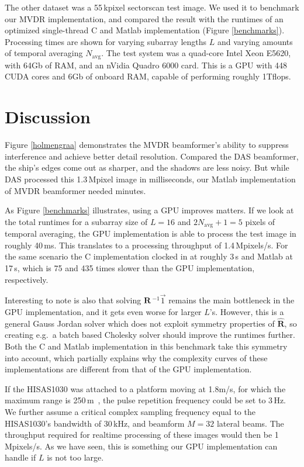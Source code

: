 \documentclass[10pt,a4paper]{article}
\newcommand\Fig[1]{Figure \ref{#1}}
\newcommand\mat[1]{\boldsymbol{#1}}
\newcommand\1{\vec 1}
\newcommand*\eR{\mat{\hat R}}
\newcommand*\eRi{\hat{\mat R}\,\!^{-1}}
\begin{document}
The other dataset was a 55\,kpixel sectorscan test image. We used it to benchmark our \gls{MVDR} implementation, and compared the result with the runtimes of an optimized single-thread C and Matlab implementation (\Fig{benchmarks}). Processing times are shown for varying subarray lengths $L$ and varying amounts of temporal averaging $N_\text{avg}$. The test system was a quad-core Intel Xeon E5620, with 64Gb of \gls{RAM}, and an nVidia Quadro 6000 card. This is a \gls{GPU} with 448 \gls{CUDA} cores and 6Gb of onboard \gls{RAM}, capable of performing roughly 1Tflops.

\section{Discussion}

Figure \ref{holmengraa} demonstrates the \gls{MVDR} beamformer's ability to suppress interference and achieve better detail resolution. Compared the \gls{DAS} beamformer, the ship's edges come out as sharper, and the shadows are less noisy. But while \gls{DAS} processed this 1.3\,Mpixel image in milliseconds, our Matlab implementation of \gls{MVDR} beamformer needed minutes.

As Figure \ref{benchmarks} illustrates, using a \gls{GPU} improves matters. If we look at the total runtimes for a subarray size of $L=16$ and $2N_\text{avg}+1=5$ pixels of temporal averaging, the \gls{GPU} implementation is able to process the test image in roughly 40\,ms. This translates to a processing throughput of 1.4\,Mpixels/s. For the same scenario the C implementation clocked in at roughly 3\,s and Matlab at 17\,s, which is 75 and 435 times slower than the \gls{GPU} implementation, respectively.

\newpage
Interesting to note is also that solving $\eRi\1$ remains the main bottleneck in the \gls{GPU} implementation, and it gets even worse for larger $L$'s. However, this is a general Gauss Jordan solver which does not exploit symmetry properties of $\eR$, so creating e.g.\ a batch based Cholesky solver should improve the runtimes further. Both the C and Matlab implementation in this benchmark take this symmetry into account, which partially explains why the complexity curves of these implementations are different from that of the \gls{GPU} implementation.

If the HISAS1030 was attached to a platform moving at 1.8m/s, for which the maximum range is 250\,m~\cite{Hansen2010}, the pulse repetition frequency could be set to 3\,Hz. We further assume a critical complex sampling frequency equal to the HISAS1030's bandwidth of 30\,kHz, and beamform $M=32$ lateral beams. The throughput required for realtime processing of these images would then be 1\,Mpixels/s. As we have seen, this is something our \gls{GPU} implementation can handle if $L$ is not too large.%
\end{document}
